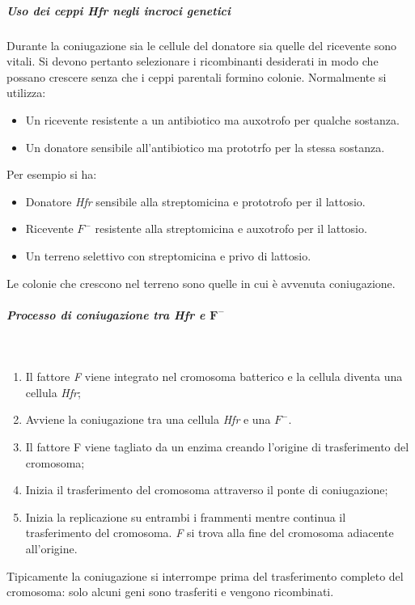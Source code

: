 				\subparagraph{Uso dei ceppi \emph{Hfr} negli incroci genetici}
				Durante la coniugazione sia le cellule del donatore sia quelle del ricevente sono vitali. 
				Si devono pertanto selezionare i ricombinanti desiderati in modo che possano crescere senza che i ceppi parentali formino colonie. 
				Normalmente si utilizza:
				\begin{multicols}{2}
					\begin{itemize}
    						\item Un ricevente resistente a un antibiotico ma auxotrofo per qualche sostanza.
    						\item Un donatore sensibile all'antibiotico ma prototrfo per la stessa sostanza.
					\end{itemize}
				\end{multicols}
				Per esempio si ha:
				\begin{multicols}{2}
					\begin{itemize}
    						\item Donatore \emph{Hfr} sensibile alla streptomicina e prototrofo per il lattosio.
    						\item Ricevente \emph{$F^{-}$} resistente alla streptomicina e auxotrofo per il lattosio.
    						\item Un terreno selettivo con streptomicina e privo di lattosio.
					\end{itemize}
				\end{multicols}
				Le colonie che crescono nel terreno sono quelle in cui \`e avvenuta coniugazione.
				
				\subparagraph{Processo di coniugazione tra \emph{Hfr} e \emph{$\mathbf{F^-}$}}\mbox{}\\
				\begin{multicols}{2}
					\begin{enumerate}
						\item Il fattore \emph{F} viene integrato nel cromosoma batterico e la cellula diventa una cellula \emph{Hfr}; 
						\item Avviene la coniugazione tra una cellula \emph{Hfr} e una \emph{$F^{-}$}. 
						\item Il fattore F viene tagliato da un enzima creando l'origine di trasferimento del cromosoma; 
    						\item Inizia il trasferimento del cromosoma attraverso il ponte di coniugazione; 
    						\item Inizia la replicazione su entrambi i frammenti mentre continua il trasferimento del cromosoma. 
							\emph{F} si trova alla fine del cromosoma adiacente all'origine.
					\end{enumerate}
				\end{multicols}
				Tipicamente la coniugazione si interrompe prima del trasferimento completo del cromosoma: solo alcuni geni sono trasferiti e vengono ricombinati.

